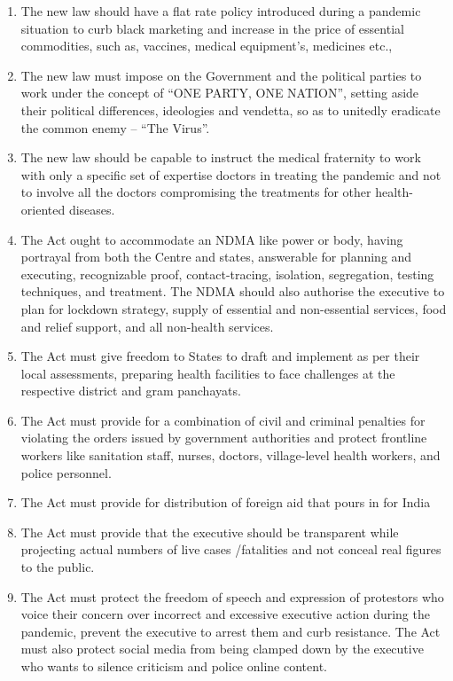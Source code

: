 \begin{multicols}{2}
\begin{enumerate}[label=$\bullet$]
\item The new law should have a flat rate policy introduced during a pandemic situation to
curb black marketing and increase in the price of essential commodities, such as,
vaccines, medical equipment’s, medicines etc.,

\item The new law must impose on the Government and the political parties to work under
the concept of “ONE PARTY, ONE NATION”, setting aside their political
differences, ideologies and vendetta, so as to unitedly eradicate the common enemy –
“The Virus”.

\item The new law should be capable to instruct the medical fraternity to work with only a
specific set of expertise doctors in treating the pandemic and not to involve all the
doctors compromising the treatments for other health-oriented diseases.

\item The Act ought to accommodate an NDMA like power or body, having portrayal from
both the Centre and states, answerable for planning and executing, recognizable proof,
contact-tracing, isolation, segregation, testing techniques, and treatment. The NDMA
should also authorise the executive to plan for lockdown strategy, supply of essential
and non-essential services, food and relief support, and all non-health services.

\item The Act must give freedom to States to draft and implement as per their local
assessments, preparing health facilities to face challenges at the respective district and
gram panchayats.

\item The Act must provide for a combination of civil and criminal penalties for violating
the orders issued by government authorities and protect frontline workers like
sanitation staff, nurses, doctors, village-level health workers, and police personnel.

\item The Act must provide for distribution of foreign aid that pours in for India

\item The Act must provide that the executive should be transparent while projecting actual
numbers of live cases /fatalities and not conceal real figures to the public.

\item The Act must protect the freedom of speech and expression of protestors who voice
their concern over incorrect and excessive executive action during the pandemic,
prevent the executive to arrest them and curb resistance. The Act must also protect
social media from being clamped down by the executive who wants to silence
criticism and police online content.


\end{enumerate}
\end{multicols}
